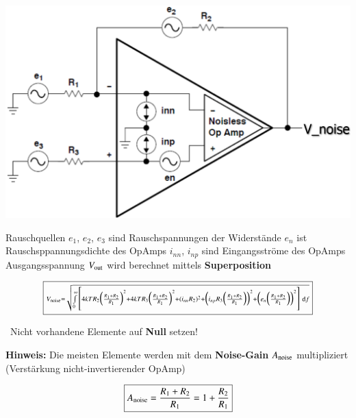 \begin{minipage}[c]{0.4\columnwidth}
    \includegraphics[width=\columnwidth]{images/rauschen_opamp.png}
\end{minipage}
\hfill
\begin{minipage}[c]{0.58\columnwidth}
    \begin{outline}
         Rauschquellen 
            \2 $e_1$, $e_2$, $e_3$ sind Rauschspannungen der Widerstände    %
            \2 $e_n$ ist Rauschsppannungsdichte des OpAmps
            \2 $i_{nn}$, $i_{np}$ sind Eingangsströme des OpAmps
        \1 Ausgangsspannung $V_{\rm out}$ wird berechnet mittels \textbf{Superposition}
    \end{outline}
\end{minipage}

$$ \boxed{ \scriptstyle{  V_{\rm noise} = \sqrt{ \int\limits_{0}^{\infty} \,  \Biggl[
    4 k T R_2 \Bigl( \frac{R_1 + R_2}{R_1} \Bigr)^2 + 4 k T R_3 \Bigl( \frac{R_1 + R_2}{R_1} \Bigr)^2
    + (i_{nn} R_2 )^2 + \Bigl(  i_{np} R_3 \Bigl( \frac{R_1 + R_2}{R_1} \Bigr) \Bigr)^2
    +  \Bigl(  e_n \Bigl( \frac{R_1 + R_2}{R_1} \Bigr) \Bigr)^2
    \Biggr] \, \ensuremath{\mathop{} \! \mathrm{d}}f } }} $$

\textrightarrow\ Nicht vorhandene Elemente auf \textbf{Null} setzen!

\vspace{0.2cm}
\begin{minipage}[c]{0.48\columnwidth}
    \textbf{Hinweis:} Die meisten Elemente werden mit dem \textbf{Noise-Gain} $A_{\rm noise}$ multipliziert 
    (Verstärkung nicht-invertierender OpAmp)
\end{minipage}
\hfill
\begin{minipage}[c]{0.48\columnwidth}
    $$ \boxed{ A_{\rm noise} = \frac{R_1 + R_2}{R_1} = 1 + \frac{R_2}{R_1}}$$
\end{minipage}


